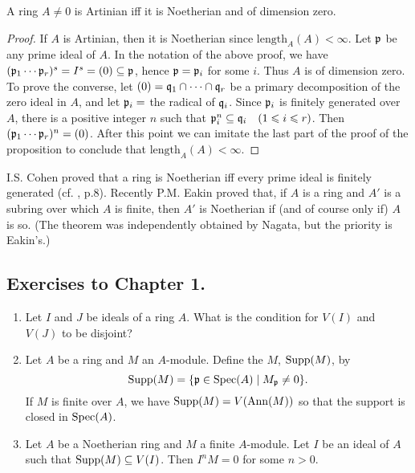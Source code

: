 \documentclass[../main]{subfiles}
\begin{document}
\begin{corollary*}
A ring $A\neq 0$ is Artinian iff it is Noetherian and of dimension zero.
\end{corollary*}
\begin{proof}
If $A$ is Artinian, then it is Noetherian since $\mathrm{length}_A(A)<\infty$. 
Let $\mathfrak{p}$ be any prime ideal of $A$. In the notation of the above proof, we have $(\mathfrak{p}_1\cdots\mathfrak{p}_r)^s=I^s=(0)\subseteq\mathfrak{p}$, hence $\mathfrak{p}=\mathfrak{p}_i$ for some $i$. Thus $A$ is of dimension zero. 
To prove the converse, let $(0)=\mathfrak{q}_1\cap\cdots\cap\mathfrak{q}_r$ be a primary decomposition of the zero ideal in $A$, and let $\mathfrak{p}_i=$ the radical of $\mathfrak{q}_i$. Since $\mathfrak{p}_i$ is finitely generated over $A$, there is a positive integer $n$ such that $\ideal{p}_i^n\subseteq\ideal{q}_i\for{1\leq i\leq r}$. Then $(\mathfrak{p}_1\cdots\mathfrak{p}_r)^n=(0)$. After this point we can imitate the last part of the proof of the proposition to conclude that $\mathrm{length}_A(A)<\infty$.
\end{proof}

\newparagraph
I.S. Cohen proved that a ring is Noetherian iff every prime ideal is finitely generated (cf. \cite{nagata1975local}, p.8). Recently P.M. Eakin \cite{eakin1968the} proved that, if $A$ is a ring and $A'$ is a subring over which $A$ is finite, then $A'$ is Noetherian if (and of course only if) $A$ is so. (The theorem was independently obtained by Nagata, but the priority is Eakin's.)

\subsection*{Exercises to Chapter 1.}
\begin{enumerate}
    \item Let $I$ and $J$ be ideals of a ring $A$. What is the condition for $V(I)$ and $V(J)$ to be disjoint?
    \item Let $A$ be a ring and $M$ an $A$-module. Define the $M$, $\operatorname{Supp}(M)$, by \[\operatorname{Supp}(M)=\{\mathfrak{p}\in\operatorname{Spec}(A)\mid M_{\mathfrak{p}}\neq 0\}.\] If $M$ is finite over $A$, we have $\operatorname{Supp}(M)=V(\operatorname{Ann}(M))$ so that the support is closed in $\operatorname{Spec}(A)$.
    \item Let $A$ be a Noetherian ring and $M$ a finite $A$-module. Let $I$ be an ideal of $A$ such that $\operatorname{Supp}(M)\subseteq V(I)$. Then $I^nM=0$ for some $n>0$.
\end{enumerate}
\end{document}
